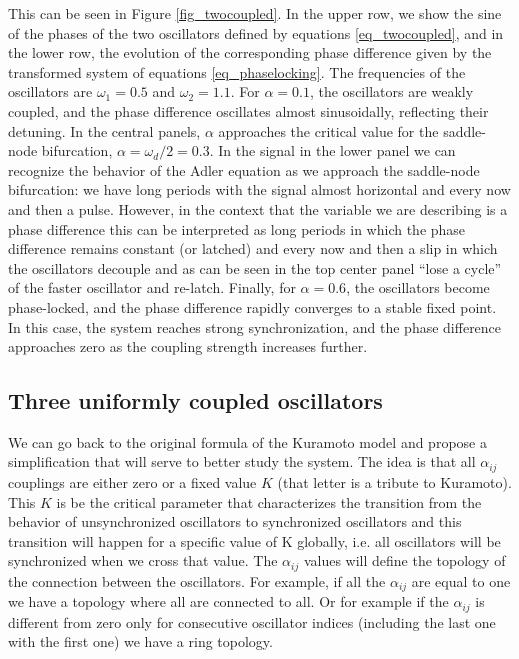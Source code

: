 \documentclass{article}
\begin{document}
This can be seen in Figure \ref{fig_twocoupled}. 
In the upper row, we show the sine of the phases of the two oscillators defined by equations \ref{eq_twocoupled}, and in the lower row, the evolution of the corresponding phase difference given by the transformed system of equations \ref{eq_phaselocking}. The frequencies of the oscillators are $\omega_1=0.5$ and $\omega_2=1.1$. 
For $\alpha = 0.1$, the oscillators are weakly coupled, and the phase difference oscillates almost sinusoidally, reflecting their detuning. 
In the central panels, $\alpha$ approaches the critical value for the saddle-node bifurcation, $\alpha = \omega_d/2 = 0.3$. 
In the signal in the lower panel we can recognize the behavior of the Adler equation as we approach the saddle-node bifurcation: we have long periods with the signal almost horizontal and every now and then a pulse. 
However, in the context that the variable we are describing is a phase difference this can be interpreted as long periods in which the phase difference remains constant (or latched) and every now and then a slip in which the oscillators decouple and as can be seen in the top center panel “lose a cycle” of the faster oscillator and re-latch. 
Finally, for $\alpha = 0.6$, the oscillators become phase-locked, and the phase difference rapidly converges to a stable fixed point. In this case, the system reaches strong synchronization, and the phase difference approaches zero as the coupling strength increases further.



\subsection{Three uniformly coupled oscillators}

We can go back to the original formula of the Kuramoto model and propose a simplification that will serve to better study the system. 
The idea is that all $\alpha_{ij}$ couplings are either zero or a fixed value $K$ (that letter is a tribute to Kuramoto). 
This $K$ is be the critical parameter that characterizes the transition from the behavior of unsynchronized oscillators to synchronized oscillators and this transition will happen for a specific value of K globally, i.e. all oscillators will be synchronized when we cross that value. 
The $\alpha_{ij}$ values will define the topology of the connection between the oscillators. 
For example, if all the $\alpha_{ij}$ are equal to one we have a topology where all are connected to all. 
Or for example if the $\alpha_{ij}$ is different from zero only for consecutive oscillator indices (including the last one with the first one) we have a ring topology.
\end{document}

